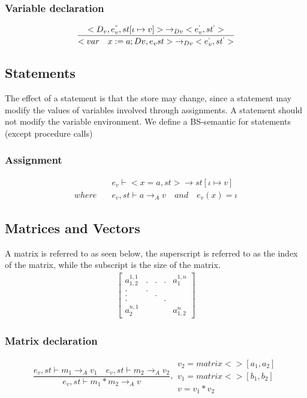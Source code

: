 \subsubsection{Variable declaration}
\begin{equation}
	\frac { <{ D }_{ v },{ e }_{ v }^{ `` },st[\iota \mapsto v]>{ \rightarrow  }_{ Dv }<{ e }_{ v }^{ ` },{ st }^{ ` }> }{ <var\quad x:=a;Dv,{ e }_{ v }st>{ \rightarrow  }_{ Dv }<{ e }_{ v }^{ ` },{ st }^{ ` }> }
\end{equation}

\subsection*{Statements}
The effect of a statement is that the store may change, since a statement may modify the values of variables involved through assignments.
A statement should not modify the variable environment.
We define a BS-semantic for statements (except procedure calls)

\subsubsection{Assignment}
\begin{align*}
	&{ e }_{ v }\vdash <x=a,st>\rightarrow st[\iota \mapsto v]\\
	where\quad &{ e }_{ v },st\vdash a{ \rightarrow  }_{ A }v\quad and\quad  { e }_{ v }(x)=\iota 
\end{align*}

\subsection*{Matrices and Vectors}
A matrix is referred to as seen below, the superscript is referred to as the index of the matrix, while the subscript is the size of the matrix.
\begin{align*}
	\begin{bmatrix} { { a }_{ 1,2 }^{ 1,1 } } & . & . & . & { a }_{ 1 }^{ 1,n } \\ . & . &  &  &  \\ . &  & . &  &  \\ . &  &  & . &  \\ { a }_{ 2 }^{ n,1 } &  &  &  & { a }_{ 1,2 }^{ n } \end{bmatrix}
\end{align*}

\subsubsection{Matrix declaration}
\begin{equation}
	\frac { { e }_{ v },st\vdash { m }_{ 1 }{ \rightarrow  }_{ A }{ v }_{ 1 }\quad { e }_{ v },st\vdash { m }_{ 2 }{ \rightarrow  }_{ A }{ v }_{ 2 } }{ { e }_{ v },st\vdash { m }_{ 1 }*{ m }_{ 2 }{ \rightarrow  }_{ A }{ v } } ,\begin{matrix} { v }_{ 2 }=matrix<>[{ a }_{ 1 },{ a }_{ 2 }] \\ { v }_{ 1 }=matrix<>[{ b }_{ 1 },{ b }_{ 2 }] \\ v={ v }_{ 1 }*{ v }_{ 2 } \end{matrix}
	\end{equation}

